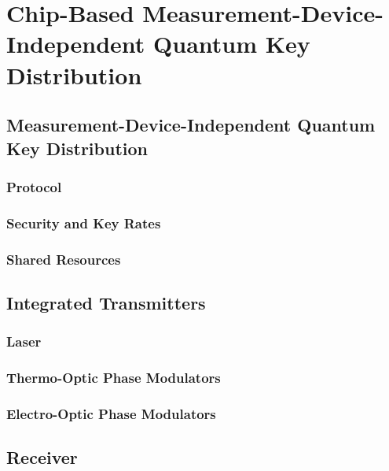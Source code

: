 %
%
\glsresetall
\graphicspath{{./chapters/chapter04/fig04/}}

\let\textcircled=\pgftextcircled
\chapter{Chip-Based Measurement-Device-Independent Quantum Key Distribution}
\label{chap:mdiqkd}

\section{Measurement-Device-Independent Quantum Key Distribution}
\label{sec:mdi-qkd}

\subsection{Protocol}

\subsection{Security and Key Rates}

\subsection{Shared Resources}

\section{Integrated Transmitters}

\subsection{Laser}

\subsection{Thermo-Optic Phase Modulators}

\subsection{Electro-Optic Phase Modulators}

\section{Receiver}

